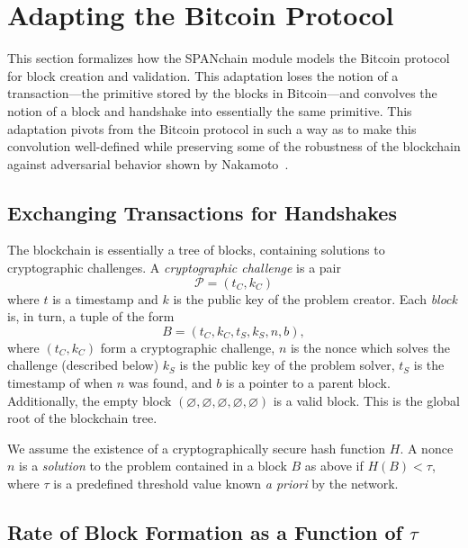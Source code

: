 \section{Adapting the Bitcoin Protocol}
\label{sec:blockchain}

This section formalizes how the SPANchain module models the Bitcoin protocol
for block creation and validation. This adaptation loses the notion of
a transaction---the primitive stored by the blocks in Bitcoin---and convolves the notion
of a block and handshake into essentially the same primitive. This adaptation
pivots from the Bitcoin protocol in such a way as to make this convolution
well-defined while preserving some of the robustness of the blockchain against
adversarial behavior shown by Nakamoto~\cite{nakamoto2008bitcoin}.

\subsection{Exchanging Transactions for Handshakes}

The blockchain is essentially a tree of blocks,
containing solutions to cryptographic challenges.
A \emph{cryptographic challenge} is a pair
\begin{equation*}
	\mathcal P = (t_C, k_C)
\end{equation*}
where $t$ is a timestamp and $k$ is the public key of the problem creator.
Each \emph{block} is, in turn, a tuple of the form
\begin{equation*}
	B = (t_C, k_C, t_S, k_S, n, b),
\end{equation*}
where $(t_C, k_C)$ form a cryptographic challenge,
$n$ is the nonce which solves the challenge (described below)
$k_S$ is the public key of the problem solver,
$t_S$ is the timestamp of when $n$ was found,
and $b$ is a pointer to a parent block.
Additionally,
the empty block $(\varnothing, \varnothing, \varnothing, \varnothing, \varnothing)$
is a valid block.
This is the global root of the blockchain tree.

We assume the existence of a cryptographically secure hash function $H$.
A nonce $n$ is a \emph{solution} to the problem contained in a block $B$ as above
if $H(B) < \tau$,
where $\tau$ is a predefined threshold value known \emph{a priori} by the network.

\subsection{Rate of Block Formation as a Function of $\tau$}

